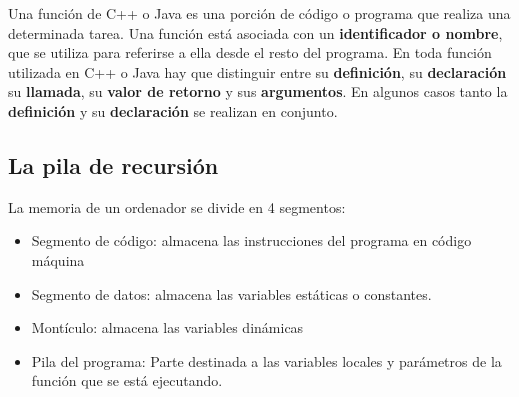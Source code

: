 Una función de C++ o Java es una porción de código o programa que realiza una determinada tarea.
Una función está asociada con un \textbf{identificador o nombre}, que se utiliza para referirse a ella
desde el resto del programa. En toda función utilizada en C++ o Java hay que distinguir entre su \textbf{definición}, su \textbf{declaración} su \textbf{llamada}, su \textbf{valor de retorno} y sus \textbf{argumentos}. En algunos casos tanto la \textbf{definición} y su \textbf{declaración} se realizan en conjunto.





\subsection{La pila de recursión}
La memoria de un ordenador se divide en 4 segmentos:

\begin{itemize}
	\item Segmento de código: almacena las instrucciones del programa en código máquina
	\item Segmento de datos: almacena las variables estáticas o constantes.
	\item Montículo: almacena las variables dinámicas
	\item Pila del programa: Parte destinada a las variables locales y parámetros de la función que se está ejecutando.
\end{itemize}